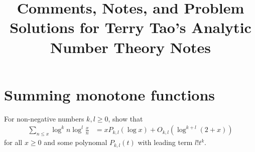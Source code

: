 \documentclass[11pt]{article}
\newenvironment{ex}[1]
  {\renewcommand\theinnercustomthm{#1}\innercustomthm}
  {\endinnercustomthm}
\begin{document}
\title{Comments, Notes, and Problem Solutions for Terry Tao's Analytic Number Theory Notes}
\date{}
\maketitle

\section{Summing monotone functions}

\begin{ex}{4}\label{four}
For non-negative numbers $k,l\geq0$, show that
\begin{align}
\sum_{n\leq x}\log^k{n}\log^l{\frac{x}{n}} &= xP_{k,l}(\log{x})+O_{k,l}(\log^{k+l}{(2+x)})\label{four_result}
\end{align}
for all $x\geq 0$ and some polynomal $P_{k,l}(t)$ with leading term $l!t^k$.
\end{ex}
\end{document}
